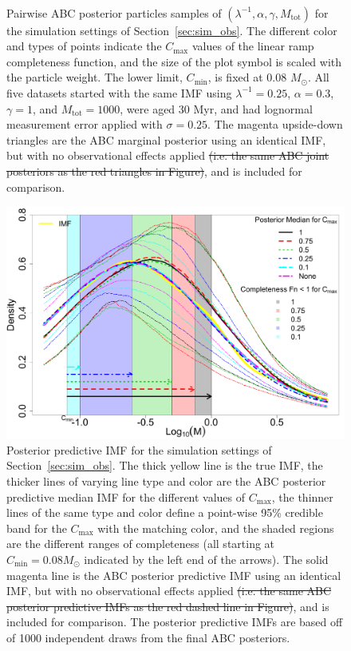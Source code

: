 \documentclass[ejs]{imsart}
\numberwithin{equation}{section}
\theoremstyle{plain}
\newcommand{\remove}[1]{\st{#1}}
\newcommand{\Msun}{M_{\odot}}
\newcommand{\Cmin}{C_{\text{min}}}
\newcommand{\Cmax}{C_{\text{max}}}
\newcommand{\Mtot}{M_{\text{tot}}}
\begin{document}
\begin{figure}[htbp]
\begin{subfigure}{0.32\textwidth}
\end{subfigure} \\
\caption{Pairwise ABC posterior particles samples of $(\lambda^{-1}, \alpha, \gamma, \Mtot)$ for the simulation settings of Section~\ref{sec:sim_obs}.  The different color and types of points indicate the $\Cmax$ values of the linear ramp completeness function, and the size of the plot symbol is scaled with the particle weight.  
The lower limit, $\Cmin$, is fixed at 0.08 $\Msun$.  
All five datasets started with the same IMF using $\lambda^{-1} = 0.25$, $\alpha = 0.3$, $\gamma = 1$, and $\Mtot = 1000$, were aged 30 Myr, and had lognormal measurement error applied with $\sigma = 0.25$.
The magenta upside-down triangles are the ABC marginal posterior using an identical IMF, but with no observational effects applied \remove{(i.e. the same ABC joint posteriors as the red triangles in Figure)}, and is included for comparison.
}
\label{fig:abc_pa_joints_obs}
\end{figure}



\begin{figure}[htbp]
\centering
\includegraphics[width=.85\textwidth]{figures/obs_pred_imf.pdf}
 \caption{Posterior predictive IMF for the simulation settings of Section~\ref{sec:sim_obs}. 
The thick yellow line is the true IMF, the thicker lines of varying line type and color are the ABC posterior predictive median IMF for the different values of $\Cmax$, 
the thinner lines of the same type and color define a point-wise 95\% credible band  for the $\Cmax$ with the matching color, and
the shaded regions are the different ranges of completeness (all starting at $\Cmin = 0.08 \Msun$ indicated by the left end of the arrows).
The solid magenta line is the ABC posterior predictive IMF using an identical IMF, but with no observational effects applied \remove{(i.e. the same ABC posterior predictive IMFs as the red dashed line in Figure)}, and is included for comparison.
The posterior predictive IMFs are based off of 1000 independent draws from the final ABC posteriors.  
} \label{fig:abc_pa_pred_obs}
\end{figure}
\end{document}
